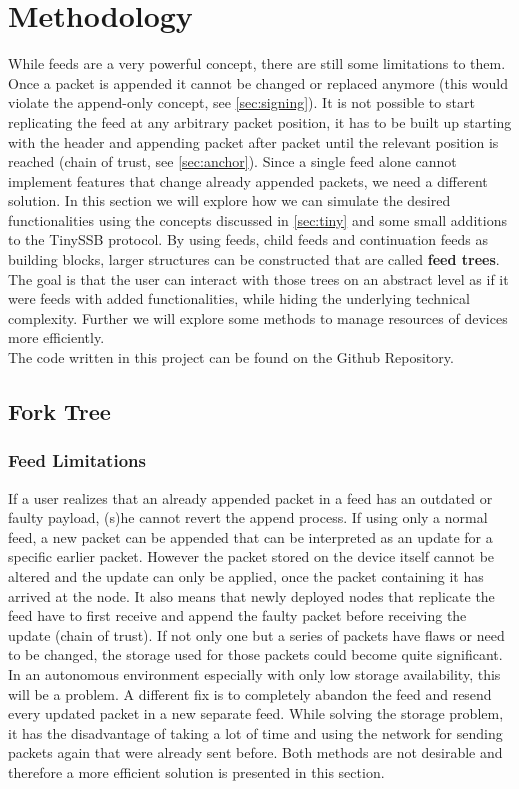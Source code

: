 \chapter{Methodology}

While feeds are a very powerful concept, there are still some limitations to them. Once a packet is appended it cannot be changed or replaced anymore (this would violate the append-only concept, see \cref{sec:signing}). It is not possible to start replicating the feed at any arbitrary packet position, it has to be built up starting with the header and appending packet after packet until the relevant position is reached (chain of trust, see \cref{sec:anchor}). Since a single feed alone cannot implement features that change already appended packets, we need a different solution. In this section we will explore how we can simulate the desired functionalities using the concepts discussed in \cref{sec:tiny} and some small additions to the TinySSB protocol. By using feeds, child feeds and continuation feeds as building blocks, larger structures can be constructed that are called \textbf{feed trees}. The goal is that the user can interact with those trees on an abstract level as if it were feeds with added functionalities, while hiding the underlying technical complexity. Further we will explore some methods to manage resources of devices more efficiently. \\
The code written in this project can be found on the Github Repository. \cite{Thesis}

\section{Fork Tree}
\label{sec:fork}
\subsection{Feed Limitations}
If a user realizes that an already appended packet in a feed has an outdated or faulty payload, (s)he cannot revert the append process. If using only a normal feed, a new packet can be appended that can be interpreted as an update for a specific earlier packet. However the packet stored on the device itself cannot be altered and the update can only be applied, once the packet containing it has arrived at the node. It also means that newly deployed nodes that replicate the feed have to first receive and append the faulty packet before receiving the update (chain of trust). If not only one but a series of packets have flaws or need to be changed, the storage used for those packets could become quite significant. In an autonomous environment especially with only low storage availability, this will be a problem. A different fix is to completely abandon the feed and resend every updated packet in a new separate feed. While solving the storage problem, it has the disadvantage of taking a lot of time and using the network for sending packets again that were already sent before. Both methods are not desirable and therefore a more efficient solution is presented in this section.

